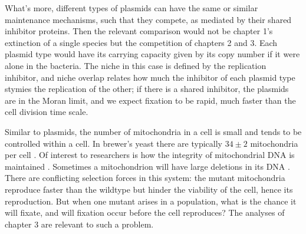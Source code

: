 What's more, different types of plasmids can have the same or similar maintenance mechanisms, such that they compete, as mediated by their shared inhibitor proteins. 
Then the relevant comparison would not be chapter 1's extinction of a single species but the competition of chapters 2 and 3. 
Each plasmid type would have its carrying capacity given by its copy number if it were alone in the bacteria. 
The niche in this case is defined by the replication inhibitor, and niche overlap relates how much the inhibitor of each plasmid type stymies the replication of the other; if there is a shared inhibitor, the plasmids are in the Moran limit, and we expect fixation to be rapid, much faster than the cell division time scale. 

Similar to plasmids, the number of mitochondria in a cell is small and tends to be controlled within a cell. 
In brewer's yeast there are typically $34\pm 2$ mitochondria per cell \cite{bionumbers}. 
Of interest to researchers is how the integrity of mitochondrial DNA is maintained \cite{Nunn}. 
Sometimes a mitochondrion will have large deletions in its DNA \cite{???}. 
There are conflicting selection forces in this system: the mutant mitochondria reproduce faster than the wildtype but hinder the viability of the cell, hence its reproduction. 
But when one mutant arises in a population, what is the chance it will fixate, and will fixation occur before the cell reproduces? 
The analyses of chapter 3 are relevant to such a problem. 

